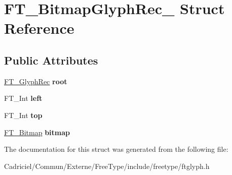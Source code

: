 \hypertarget{struct_f_t___bitmap_glyph_rec__}{\section{F\-T\-\_\-\-Bitmap\-Glyph\-Rec\-\_\- Struct Reference}
\label{struct_f_t___bitmap_glyph_rec__}
}
\subsection*{Public Attributes}
\begin{DoxyCompactItemize}
\item 
\hypertarget{struct_f_t___bitmap_glyph_rec___ac3970353fbc0fe3d4c59c3fd608140f3}{\hyperlink{struct_f_t___glyph_rec__}{F\-T\-\_\-\-Glyph\-Rec} {\bfseries root}}\label{struct_f_t___bitmap_glyph_rec___ac3970353fbc0fe3d4c59c3fd608140f3}

\item 
\hypertarget{struct_f_t___bitmap_glyph_rec___a6cfd2d89af7b6be4af886047c9cb7e0a}{F\-T\-\_\-\-Int {\bfseries left}}\label{struct_f_t___bitmap_glyph_rec___a6cfd2d89af7b6be4af886047c9cb7e0a}

\item 
\hypertarget{struct_f_t___bitmap_glyph_rec___a25fc81296678d6a2d064843c01bc05f7}{F\-T\-\_\-\-Int {\bfseries top}}\label{struct_f_t___bitmap_glyph_rec___a25fc81296678d6a2d064843c01bc05f7}

\item 
\hypertarget{struct_f_t___bitmap_glyph_rec___a16ecd0725920f8d5ad4c14e9448126ad}{\hyperlink{struct_f_t___bitmap__}{F\-T\-\_\-\-Bitmap} {\bfseries bitmap}}\label{struct_f_t___bitmap_glyph_rec___a16ecd0725920f8d5ad4c14e9448126ad}

\end{DoxyCompactItemize}


The documentation for this struct was generated from the following file\-:\begin{DoxyCompactItemize}
\item 
Cadriciel/\-Commun/\-Externe/\-Free\-Type/include/freetype/ftglyph.\-h\end{DoxyCompactItemize}

